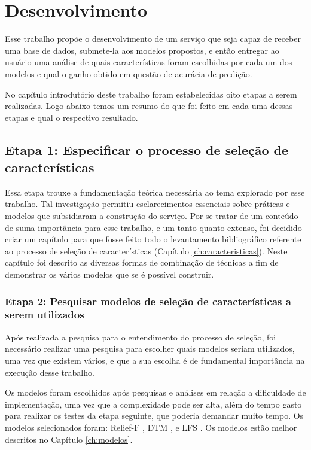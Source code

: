 \chapter[Desenvolvimento]{Desenvolvimento}

Esse trabalho propõe o desenvolvimento de um serviço que seja capaz de receber uma base de dados, submete-la aos modelos propostos, e então entregar ao usuário uma análise de quais características foram escolhidas por cada um dos modelos e qual o ganho obtido em questão de acurácia de predição.

No capítulo introdutório deste trabalho foram estabelecidas oito etapas a serem realizadas. Logo abaixo temos um resumo do que foi feito em cada uma dessas etapas e qual o respectivo resultado.

\section{Etapa 1: Especificar o processo de seleção de características}

Essa etapa trouxe a fundamentação teórica necessária ao tema explorado por esse trabalho. Tal investigação permitiu esclarecimentos essenciais sobre práticas e modelos que subsidiaram a construção do serviço. Por se tratar de um conteúdo de suma importância para esse trabalho, e um tanto quanto extenso, foi decidido criar um capítulo para que fosse feito todo o levantamento bibliográfico referente ao processo de seleção de características (Capítulo \ref{ch:caracteristicas}). Neste capítulo foi descrito as diversas formas de combinação de técnicas a fim de demonstrar os vários modelos que se é possível construir.

\subsection{Etapa 2: Pesquisar modelos de seleção de características a serem utilizados}

Após realizada a pesquisa para o entendimento do processo de seleção, foi necessário realizar uma pesquisa para escolher quais modelos seriam utilizados, uma vez que existem vários, e que a sua escolha é de fundamental importância na execução desse trabalho. 

Os modelos foram escolhidos após pesquisas e análises em relação a dificuldade de implementação, uma vez que a complexidade pode ser alta, além do tempo gasto para realizar os testes da etapa seguinte, que poderia demandar muito tempo. Os modelos selecionados foram: Relief-F \cite{dash_1997}, DTM \cite{dash_1997}, e LFS \cite{gutlein_2009}. Os modelos estão melhor descritos no Capítulo \ref{ch:modelos}.

